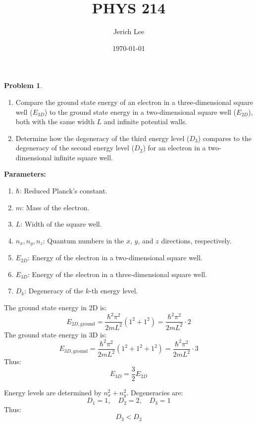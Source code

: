 \documentclass[12pt]{article}
\title{PHYS 214}
\author{Jerich Lee}
\date{\today}
\theoremstyle{definition} %
\newtheorem{problem}{Problem}
\theoremstyle{plain} %
\begin{document}
\maketitle

\begin{problem}
    \begin{enumerate}
        \item Compare the ground state energy of an electron in a three-dimensional square well (\(E_{3D}\)) to the ground state energy in a two-dimensional square well (\(E_{2D}\)), both with the same width \(L\) and infinite potential walls.
        \item Determine how the degeneracy of the third energy level (\(D_3\)) compares to the degeneracy of the second energy level (\(D_2\)) for an electron in a two-dimensional infinite square well.
    \end{enumerate}
    
    \textbf{Parameters:}
    \begin{enumerate}
        \item \(\hbar\): Reduced Planck's constant.
        \item \(m\): Mass of the electron.
        \item \(L\): Width of the square well.
        \item \(n_x, n_y, n_z\): Quantum numbers in the \(x\), \(y\), and \(z\) directions, respectively.
        \item \(E_{2D}\): Energy of the electron in a two-dimensional square well.
        \item \(E_{3D}\): Energy of the electron in a three-dimensional square well.
        \item \(D_k\): Degeneracy of the \(k\)-th energy level.
    \end{enumerate}
    
The ground state energy in 2D is:
    $$
    E_{2D, \text{ground}} = \frac{\hbar^2 \pi^2}{2mL^2} (1^2 + 1^2) = \frac{\hbar^2 \pi^2}{2mL^2} \cdot 2
    $$
    The ground state energy in 3D is:
    $$
    E_{3D, \text{ground}} = \frac{\hbar^2 \pi^2}{2mL^2} (1^2 + 1^2 + 1^2) = \frac{\hbar^2 \pi^2}{2mL^2} \cdot 3
    $$
    Thus:
    $$
    E_{3D} = \frac{3}{2} E_{2D}
    $$
    
Energy levels are determined by \(n_x^2 + n_y^2\). Degeneracies are:
    $$
    D_1 = 1, \quad D_2 = 2, \quad D_3 = 1
    $$
    Thus:
    $$
    D_3 < D_2
    $$
\end{problem}
\end{document}

